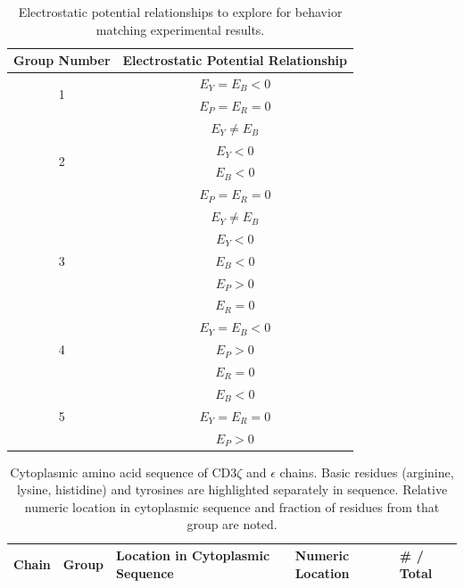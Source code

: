 \documentclass[../../AdvancementSummary.tex]{subfiles}
\begin{document}
{\begin{table}[H]
\caption{Electrostatic potential relationships to explore for behavior matching experimental results. \label{table: ElecPotentialRelationships}}
\begin{center}
\begin{tabular}{| c | c |}
\hline
Group Number & Electrostatic Potential Relationship \\
\hline
\multicolumn{1}{|c|}{\multirow{2}[0]{*}{1}}  &  $E_Y = E_B < 0$\\
							&	   $E_P = E_R = 0 $\\
\hline
\multicolumn{1}{|c|}{\multirow{4}[0]{*}{2}}  &  $E_Y \neq E_B $\\
							&	   $E_Y < 0$ \\
							&	   $E_B < 0$ \\
							&	  $E_P = E_R = 0 $\\
\hline
\multicolumn{1}{|c|}{\multirow{5}[0]{*}{3}} 	& $E_Y \neq E_B$\\
							        & $E_Y < 0$ \\
								& $E_B < 0$ \\
								& $E_P > 0 $\\
								& $E_R = 0 $\\
\hline
\multicolumn{1}{|c|}{\multirow{3}[0]{*}{4}} 	& $E_Y = E_B <0 $\\
								& $E_P > 0 $\\
								& $E_R = 0 $\\
\hline
\multicolumn{1}{|c|}{\multirow{3}[0]{*}{5}} 	& $E_B <0 $\\
								& $E_Y = E_R=0 $\\
								& $E_P > 0 $\\
\hline
\end{tabular}
\end{center}
\end{table}					




\begin{table}[H]
    \caption{Cytoplasmic amino acid sequence of CD3$\zeta$ and $\epsilon$ chains.  Basic residues (arginine, lysine, histidine) and tyrosines are highlighted separately in sequence.  Relative numeric location in cytoplasmic sequence and fraction of residues from that group are noted. \label{table: BasicsYLocation}}
    \begin{center}
    \begin{tabular}{|c|p{2cm}|p{6cm}|p{3.5cm}|p{1.6cm}|}
    	\hline
	Chain 		& 		Group			&		Location in Cytoplasmic Sequence	&	Numeric Location		&		\# / Total	\\
	\hline
	

\end{tabular}
\end{center}
\end{table}}
\end{document}
